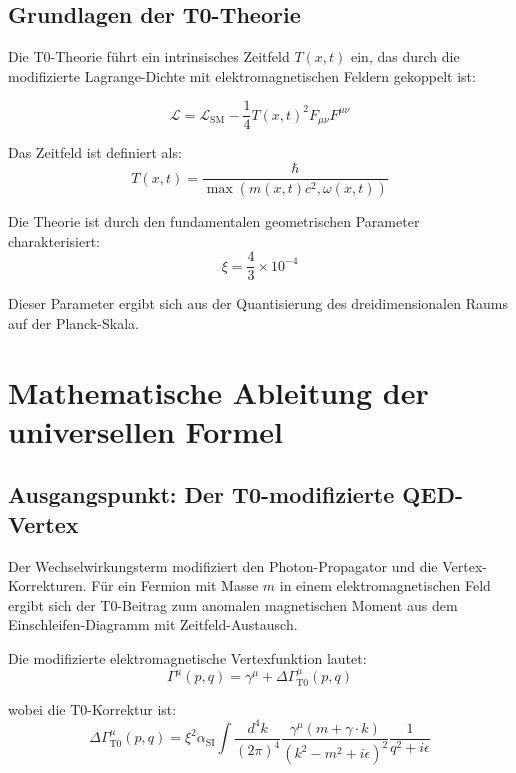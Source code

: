 \documentclass[12pt,a4paper]{article}
\newcommand{\xipar}{\xi}
\newcommand{\alphaSI}{\alpha_{\text{SI}}}
\newcommand{\calL}{\mathcal{L}}
\begin{document}
	\subsection{Grundlagen der T0-Theorie}
	
	Die T0-Theorie führt ein intrinsisches Zeitfeld $T(x,t)$ ein, das durch die modifizierte Lagrange-Dichte mit elektromagnetischen Feldern gekoppelt ist:
	
	\begin{equation}
		\calL = \calL_{\text{SM}} - \frac{1}{4}T(x,t)^2 F_{\mu\nu}F^{\mu\nu}
	\end{equation}
	
	Das Zeitfeld ist definiert als:
	\begin{equation}
		T(x,t) = \frac{\hbar}{\max(m(x,t)c^2, \omega(x,t))}
	\end{equation}
	
	Die Theorie ist durch den fundamentalen geometrischen Parameter charakterisiert:
	\begin{equation}
		\xipar = \frac{4}{3} \times 10^{-4}
	\end{equation}
	
	Dieser Parameter ergibt sich aus der Quantisierung des dreidimensionalen Raums auf der Planck-Skala.
	
	\section{Mathematische Ableitung der universellen Formel}
	
	\subsection{Ausgangspunkt: Der T0-modifizierte QED-Vertex}
	
	Der Wechselwirkungsterm modifiziert den Photon-Propagator und die Vertex-Korrekturen. Für ein Fermion mit Masse $m$ in einem elektromagnetischen Feld ergibt sich der T0-Beitrag zum anomalen magnetischen Moment aus dem Einschleifen-Diagramm mit Zeitfeld-Austausch.
	
	Die modifizierte elektromagnetische Vertexfunktion lautet:
	\begin{equation}
		\Gamma^\mu(p,q) = \gamma^\mu + \Delta\Gamma^\mu_{\text{T0}}(p,q)
	\end{equation}
	
	wobei die T0-Korrektur ist:
	\begin{equation}
		\Delta\Gamma^\mu_{\text{T0}}(p,q) = \xipar^2 \alphaSI \int \frac{d^4k}{(2\pi)^4} \frac{\gamma^\mu (m + \gamma \cdot k)}{(k^2 - m^2 + i\epsilon)^2} \frac{1}{q^2 + i\epsilon}
	\end{equation}
	
\end{document}
